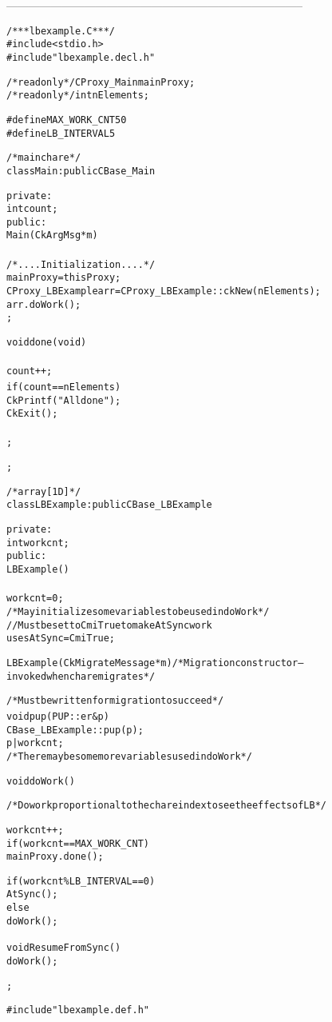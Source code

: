 --------------------------------------------------------------------------------

\begin{alltt}
/*** lbexample.C ***/
#include <stdio.h>
#include "lbexample.decl.h"

/*readonly*/ CProxy_Main mainProxy;
/*readonly*/ int nElements;

#define MAX_WORK_CNT 50
#define LB_INTERVAL 5

/*mainchare*/
class Main : public CBase_Main
{
private:
  int count;
public:
  Main(CkArgMsg* m)
  {
    /*....Initialization....*/
    mainProxy = thisProxy;
    CProxy_LBExample arr = CProxy_LBExample::ckNew(nElements);
    arr.doWork();
  };

  void done(void)
  {
    count++;
    if(count==nElements){
      CkPrintf("All done");
      CkExit();
    }
  };
};

/*array [1D]*/
class LBExample : public CBase_LBExample
{
private:
  int workcnt;
public:
  LBExample()
  {
    workcnt=0;
    /* May initialize some variables to be used in doWork */
    //Must be set to CmiTrue to make AtSync work
    usesAtSync=CmiTrue;
  }

  LBExample(CkMigrateMessage *m) { /* Migration constructor -- invoked when chare migrates */ }
  
  /* Must be written for migration to succeed */
  void pup(PUP::er &p){
    CBase_LBExample::pup(p);
    p|workcnt;
    /* There may be some more variables used in doWork */
  }
	
  void doWork()
  {
    /* Do work proportional to the chare index to see the effects of LB */
    
    workcnt++;
    if(workcnt==MAX_WORK_CNT)
      mainProxy.done();
    
    if(workcnt\%LB_INTERVAL==0)
      AtSync();
    else
      doWork();
  }
  
  void ResumeFromSync(){
    doWork();
  }
};

#include "lbexample.def.h"
\end{alltt}
